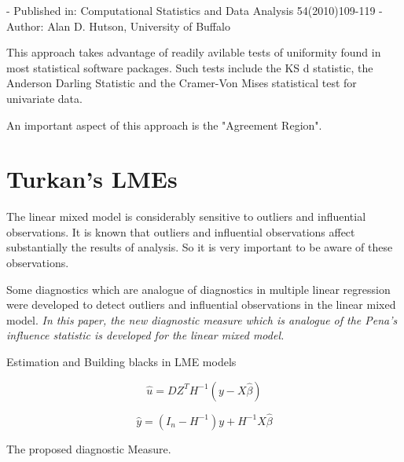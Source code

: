 \documentclass[12pt, a4paper]{report}
\theoremstyle{plain}
\theoremstyle{definition}
\theoremstyle{remark}
\begin{document}
- Published in: Computational Statistics and Data Analysis 54(2010)109-119
- Author: Alan D. Hutson, University of Buffalo



This approach takes advantage of readily avilable tests of uniformity found in most statistical software packages.
Such tests include the KS d statistic, the Anderson Darling Statistic and the Cramer-Von Mises statistical test for univariate data.

An important aspect of this approach is the "Agreement Region".




\section{Turkan's LMEs}


The linear mixed model is considerably sensitive to outliers and influential observations. 
It is known that outliers and influential observations affect substantially the results of analysis. 
So it is very important to be aware of these observations. 

Some diagnostics which are analogue of diagnostics in multiple linear regression were developed to detect 
outliers and influential observations in the linear mixed model. 
\emph{
	In this paper, the new diagnostic measure which is analogue of the Pena's influence statistic is developed for 
	the linear mixed model.
}



Estimation and Building blacks in LME models


\[ \hat{u} = DZ^{T}H^{-1}(y-X\hat{\beta}) \]

\[ \hat{y} = (I_n -  H^{-1})y + H^{-1}X\hat{\beta}\]


The proposed diagnostic Measure.

\end{document}
